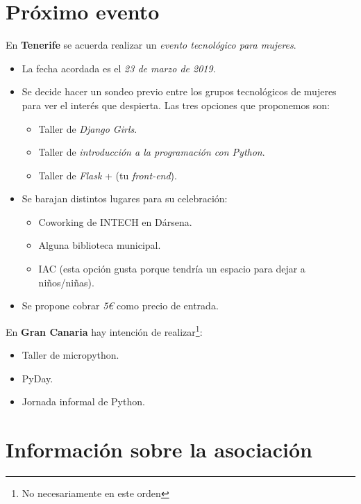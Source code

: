 \documentclass[a4paper, 12pt]{article}
\begin{document}
\section{Próximo evento}

En \textbf{Tenerife} se acuerda realizar un \textit{evento tecnológico para mujeres}.

\begin{itemize}
    \item La fecha acordada es el \textit{23 de marzo de 2019}.
    \item Se decide hacer un sondeo previo entre los grupos tecnológicos de mujeres para ver el interés que despierta. Las tres opciones que proponemos son:
    \begin{itemize}
        \item Taller de \textit{Django Girls}.
        \item Taller de \textit{introducción a la programación con Python}.
        \item Taller de \textit{Flask} + (tu \textit{front-end}).
    \end{itemize}
    \item Se barajan distintos lugares para su celebración:
    \begin{itemize}
        \item Coworking de INTECH en Dársena.
        \item Alguna biblioteca municipal.
        \item IAC (esta opción gusta porque tendría un espacio para dejar a niños/niñas).
    \end{itemize}
    \item Se propone cobrar \textit{5\euro} como precio de entrada.
\end{itemize}

En \textbf{Gran Canaria} hay intención de realizar\footnote{No necesariamente en este orden}:

\begin{itemize}
    \item Taller de micropython.
    \item PyDay.
    \item Jornada informal de Python.
\end{itemize}

\section{Información sobre la asociación}
\end{document}
